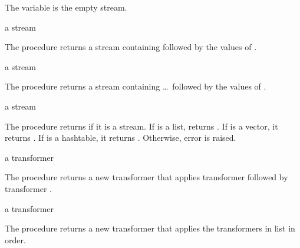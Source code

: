 \begin{variable}
\end{variable}
\antipar

The  variable is the empty stream.

\begin{procedure}
\end{procedure}
\returns{} a stream

The  procedure returns a stream containing  followed by the
values of .

\begin{procedure}
\end{procedure}
\returns{} a stream

The  procedure returns a stream containing  \ldots\ followed by
the values of .

\begin{procedure}
\end{procedure}
\returns{} a stream

The  procedure returns  if it is a stream. If  is a
list,  returns . If  is a vector,
it returns . If  is a hashtable, it returns
. Otherwise, error  is
raised.

\begin{procedure}
\end{procedure}
\returns{} a transformer

The  procedure returns a new transformer that applies
transformer  followed by transformer .

\begin{procedure}
\end{procedure}
\returns{} a transformer

The  procedure returns a new transformer that applies the
transformers in list  in order.
